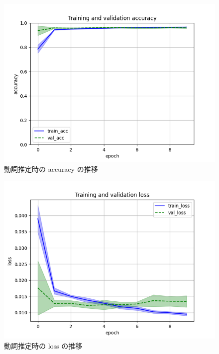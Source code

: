 \documentclass[twocolumn]{jarticle}
\begin{document}
\begin{figure}[tbp]
      \includegraphics[width=\linewidth]{doushi_acc.png}
      \caption{動詞推定時の accuracy の推移}
      \label{fig:dou_acc}
\end{figure}
\begin{figure}[tbp]
      \includegraphics[width=\linewidth]{doushi_loss.png}
      \caption{動詞推定時の loss の推移}
      \label{fig:dou_loss}
\end{figure}
\end{document}
